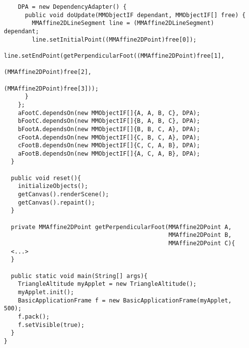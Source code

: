 \begin{footnotesize}
\begin{verbatim}
    DPA = new DependencyAdapter() {
      public void doUpdate(MMObjectIF dependant, MMObjectIF[] free) {
        MMAffine2DLineSegment line = (MMAffine2DLineSegment) dependant;
        line.setInitialPoint((MMAffine2DPoint)free[0]);
        line.setEndPoint(getPerpendicularFoot((MMAffine2DPoint)free[1],
                                                (MMAffine2DPoint)free[2],
                                                (MMAffine2DPoint)free[3]));
      }
    };
    aFootC.dependsOn(new MMObjectIF[]{A, A, B, C}, DPA);
    bFootC.dependsOn(new MMObjectIF[]{B, A, B, C}, DPA);
    bFootA.dependsOn(new MMObjectIF[]{B, B, C, A}, DPA);
    cFootA.dependsOn(new MMObjectIF[]{C, B, C, A}, DPA);
    cFootB.dependsOn(new MMObjectIF[]{C, C, A, B}, DPA);
    aFootB.dependsOn(new MMObjectIF[]{A, C, A, B}, DPA);
  }
  
  public void reset(){
    initializeObjects();
    getCanvas().renderScene();
    getCanvas().repaint();
  }
  
  private MMAffine2DPoint getPerpendicularFoot(MMAffine2DPoint A,
                                               MMAffine2DPoint B,
                                               MMAffine2DPoint C){
  <...>
  }
  
  public static void main(String[] args){
    TriangleAltitude myApplet = new TriangleAltitude();
    myApplet.init();
    BasicApplicationFrame f = new BasicApplicationFrame(myApplet, 500);
    f.pack();
    f.setVisible(true);
  }
}
  \end{verbatim}
  \end{footnotesize}
